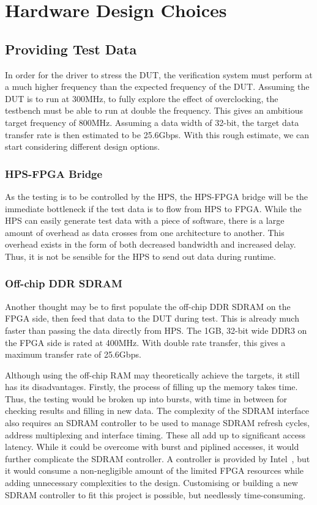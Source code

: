 \section{Hardware Design Choices}

\subsection{Providing Test Data}
In order for the driver to stress the DUT, the verification system must perform at a much higher frequency than the expected frequency of the DUT.
Assuming the DUT is to run at 300MHz, to fully explore the effect of overclocking, the testbench must be able to run at double the frequency.
This gives an ambitious target frequency of 800MHz.
Assuming a data width of 32-bit, the target data transfer rate is then estimated to be 25.6Gbps.
With this rough estimate, we can start considering different design options.

\subsubsection{HPS-FPGA Bridge}
As the testing is to be controlled by the HPS, the HPS-FPGA bridge will be the immediate bottleneck if the test data is to flow from HPS to FPGA.
While the HPS can easily generate test data with a piece of software, there is a large amount of overhead as data crosses from one architecture to another.
This overhead exists in the form of both decreased bandwidth and increased delay.
Thus, it is not be sensible for the HPS to send out data during runtime.

\subsubsection{Off-chip DDR SDRAM}
Another thought may be to first populate the off-chip DDR SDRAM on the FPGA side, then feed that data to the DUT during test.
This is already much faster than passing the data directly from HPS.
The 1GB, 32-bit wide DDR3 on the FPGA side is rated at 400MHz.
With double rate transfer, this gives a maximum transfer rate of 25.6Gbps.

Although using the off-chip RAM may theoretically achieve the targets, it still has its disadvantages.
Firstly, the process of filling up the memory takes time.
Thus, the testing would be broken up into bursts, with time in between for checking results and filling in new data.
The complexity of the SDRAM interface also requires an SDRAM controller to be used to manage SDRAM refresh cycles, address multiplexing and interface timing.
These all add up to significant access latency.
While it could be overcome with burst and piplined accesses, it would further complicate the SDRAM controller.
A controller is provided by Intel~\cite{Altera3}, but it would consume a non-negligible amount of the limited FPGA resources while adding unnecessary complexities to the design.
Customising or building a new SDRAM controller to fit this project is possible, but needlessly time-consuming.

